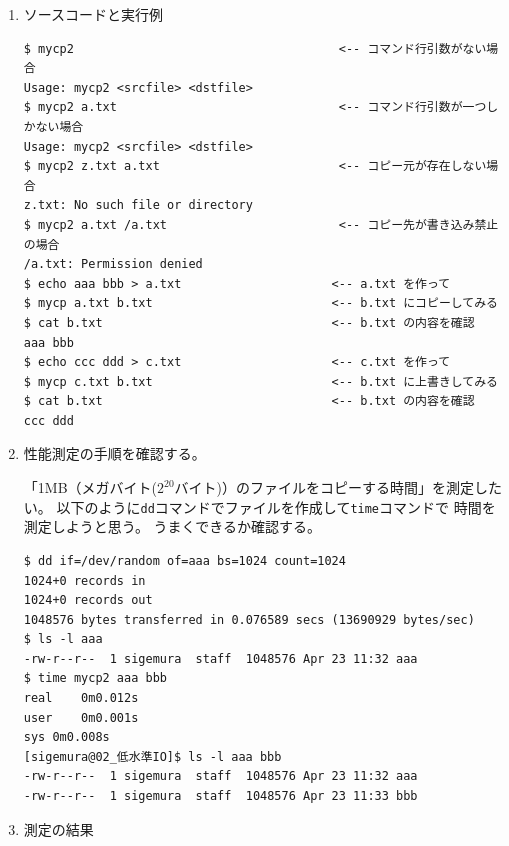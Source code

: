 \documentclass[a4j,dvipdfmx]{jarticle}
\begin{document}
\def\lstlistingname{リスト}

\begin{enumerate}
\item ソースコードと実行例



\begin{lstlisting}[caption=実行例（動作テスト！！）]
$ mycp2                                     <-- コマンド行引数がない場合
Usage: mycp2 <srcfile> <dstfile>
$ mycp2 a.txt                               <-- コマンド行引数が一つしかない場合
Usage: mycp2 <srcfile> <dstfile>
$ mycp2 z.txt a.txt                         <-- コピー元が存在しない場合
z.txt: No such file or directory
$ mycp2 a.txt /a.txt                        <-- コピー先が書き込み禁止の場合
/a.txt: Permission denied
$ echo aaa bbb > a.txt                     <-- a.txt を作って
$ mycp a.txt b.txt                         <-- b.txt にコピーしてみる
$ cat b.txt                                <-- b.txt の内容を確認
aaa bbb
$ echo ccc ddd > c.txt                     <-- c.txt を作って
$ mycp c.txt b.txt                         <-- b.txt に上書きしてみる
$ cat b.txt                                <-- b.txt の内容を確認
ccc ddd
\end{lstlisting}

\newpage

\item 性能測定の手順を確認する。

「1MB（メガバイト($2^{20}$バイト)）のファイルをコピーする時間」を測定したい。
以下のように{\tt dd}コマンドでファイルを作成して{\tt time}コマンドで
時間を測定しようと思う。
うまくできるか確認する。

\begin{lstlisting}[caption=性能測定手順]
$ dd if=/dev/random of=aaa bs=1024 count=1024
1024+0 records in
1024+0 records out
1048576 bytes transferred in 0.076589 secs (13690929 bytes/sec)
$ ls -l aaa
-rw-r--r--  1 sigemura  staff  1048576 Apr 23 11:32 aaa
$ time mycp2 aaa bbb
real	0m0.012s
user	0m0.001s
sys	0m0.008s
[sigemura@02_低水準IO]$ ls -l aaa bbb
-rw-r--r--  1 sigemura  staff  1048576 Apr 23 11:32 aaa
-rw-r--r--  1 sigemura  staff  1048576 Apr 23 11:33 bbb
\end{lstlisting}

\item 測定の結果


\end{enumerate}
\end{document}
